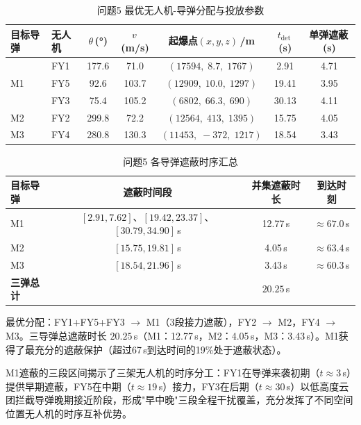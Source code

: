 \documentclass[12pt, a4paper]{article}
\begin{document}
\begin{table}[H]
\centering
\caption{问题5 最优无人机-导弹分配与投放参数}
\begin{tabular}{llccccc}
\toprule
目标导弹 & 无人机 & $\theta$\,(°) & $v$\,(m/s) & 起爆点$(x,y,z)$\,/m & $t_{\mathrm{det}}$\,(s) & 单弹遮蔽\,(s) \\
\midrule
\multirow{3}{*}{M1} & FY1 & 177.6 & 71.0 & $(17594,\;8.7,\;1767)$ & 2.91 & 4.71 \\
 & FY5 & 92.6 & 103.7 & $(12909,\;10.0,\;1297)$ & 19.41 & 3.95 \\
 & FY3 & 75.4 & 105.2 & $(6802,\;66.3,\;690)$ & 30.13 & 4.11 \\
\midrule
M2 & FY2 & 299.8 & 72.2 & $(12564,\;413,\;1395)$ & 15.75 & 4.05 \\
\midrule
M3 & FY4 & 280.8 & 130.3 & $(11453,\;-372,\;1217)$ & 18.54 & 3.43 \\
\bottomrule
\end{tabular}
\end{table}

\begin{table}[H]
\centering
\caption{问题5 各导弹遮蔽时序汇总}
\begin{tabular}{lccc}
\toprule
目标导弹 & 遮蔽时间段 & 并集遮蔽时长 & 到达时刻 \\
\midrule
M1 & $[2.91,7.62]$、$[19.42,23.37]$、$[30.79,34.90]$\,s & 12.77\,s & $\approx67.0$\,s \\
M2 & $[15.75,19.81]$\,s & 4.05\,s & $\approx63.4$\,s \\
M3 & $[18.54,21.96]$\,s & 3.43\,s & $\approx60.3$\,s \\
\midrule
\textbf{三弹总计} & & $\mathbf{20.25}$\,s & \\
\bottomrule
\end{tabular}
\end{table}

\begin{resultbox}[问题5 最优结论]
最优分配：FY1+FY5+FY3 $\to$ M1（3段接力遮蔽），FY2 $\to$ M2，FY4 $\to$ M3。三导弹总遮蔽时长 $\mathbf{20.25}$\,s（M1：12.77\,s，M2：4.05\,s，M3：3.43\,s）。M1获得了最充分的遮蔽保护（超过67\,s到达时间的19\%处于遮蔽状态）。
\end{resultbox}

M1遮蔽的三段区间揭示了三架无人机的时序分工：FY1在导弹来袭初期（$t\approx3$\,s）提供早期遮蔽，FY5在中期（$t\approx19$\,s）接力，FY3在后期（$t\approx30$\,s）以低高度云团拦截导弹晚期接近阶段，形成"早中晚"三段全程干扰覆盖，充分发挥了不同空间位置无人机的时序互补优势。
\end{document}
